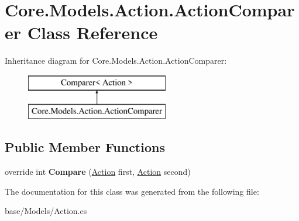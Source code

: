 \hypertarget{classCore_1_1Models_1_1Action_1_1ActionComparer}{\section{Core.\-Models.\-Action.\-Action\-Comparer Class Reference}
\label{classCore_1_1Models_1_1Action_1_1ActionComparer}
}
Inheritance diagram for Core.\-Models.\-Action.\-Action\-Comparer\-:\begin{figure}[H]
\begin{center}
\leavevmode
\includegraphics[height=2.000000cm]{classCore_1_1Models_1_1Action_1_1ActionComparer}
\end{center}
\end{figure}
\subsection*{Public Member Functions}
\begin{DoxyCompactItemize}
\item 
\hypertarget{classCore_1_1Models_1_1Action_1_1ActionComparer_a876fafb59816fb7f9b7c0c35a9312c7a}{override int {\bfseries Compare} (\hyperlink{classCore_1_1Models_1_1Action}{Action} first, \hyperlink{classCore_1_1Models_1_1Action}{Action} second)}\label{classCore_1_1Models_1_1Action_1_1ActionComparer_a876fafb59816fb7f9b7c0c35a9312c7a}

\end{DoxyCompactItemize}


The documentation for this class was generated from the following file\-:\begin{DoxyCompactItemize}
\item 
base/\-Models/Action.\-cs\end{DoxyCompactItemize}
